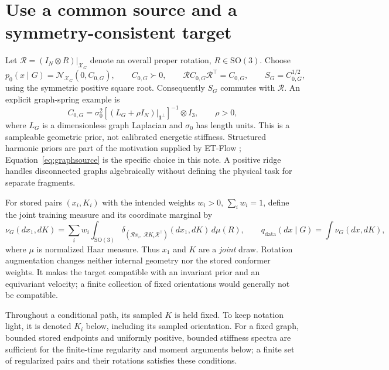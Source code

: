 \documentclass[11pt,letterpaper]{article}
\newcommand{\X}{\mathcal X_G}
\newcommand{\SO}{\mathrm{SO}(3)}
\begin{document}
\section{Use a common source and a symmetry-consistent target}\label{sec:source}

Let $\mathcal R=(I_N\otimes R)|_{\X}$ denote an overall proper rotation, $R\in\SO$. Choose
\begin{equation}\label{eq:source}
p_0(x\mid G)=\mathcal N_{\X}(0,C_{0,G}),\qquad
C_{0,G}\succ0,\qquad
\mathcal R C_{0,G}\mathcal R^\top=C_{0,G},\qquad
S_G=C_{0,G}^{1/2},
\end{equation}
using the symmetric positive square root. Consequently $S_G$ commutes with $\mathcal R$. An explicit graph-spring example is
\begin{equation}\label{eq:graphsource}
C_{0,G}=\sigma_0^2
\left[(L_G+\rho I_N)|_{\mathbf1^\perp}\right]^{-1}\otimes I_3,
\qquad \rho>0,
\end{equation}
where $L_G$ is a dimensionless graph Laplacian and $\sigma_0$ has length units. This is a sampleable geometric prior, not calibrated energetic stiffness. Structured harmonic priors are part of the motivation supplied by ET-Flow \cite{hassan}; Equation~\eqref{eq:graphsource} is the specific choice in this note. A positive ridge handles disconnected graphs algebraically without defining the physical task for separate fragments.

For stored pairs $(x_i,K_i)$ with the intended weights $w_i>0$, $\sum_iw_i=1$, define the joint training measure and its coordinate marginal by
\begin{equation}\label{eq:joint}
\nu_G(dx_1,dK)=\sum_i w_i\int_{\SO}
\delta_{(\mathcal R x_i,\,\mathcal R K_i\mathcal R^\top)}(dx_1,dK)\,d\mu(R),
\qquad
q_{\mathrm{data}}(dx\mid G)=\int\nu_G(dx,dK),
\end{equation}
where $\mu$ is normalized Haar measure. Thus $x_1$ and $K$ are a \emph{joint} draw. Rotation augmentation changes neither internal geometry nor the stored conformer weights. It makes the target compatible with an invariant prior and an equivariant velocity; a finite collection of fixed orientations would generally not be compatible.

Throughout a conditional path, its sampled $K$ is held fixed. To keep notation light, it is denoted $K_i$ below, including its sampled orientation. For a fixed graph, bounded stored endpoints and uniformly positive, bounded stiffness spectra are sufficient for the finite-time regularity and moment arguments below; a finite set of regularized pairs and their rotations satisfies these conditions.
\end{document}
